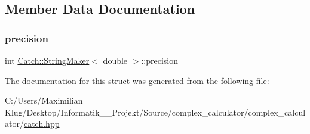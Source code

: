 \subsection{Member Data Documentation}
\mbox{\label{struct_catch_1_1_string_maker_3_01double_01_4_a15fa2b093c532ece7f1d0c713ebaee67}} 
\subsubsection{\texorpdfstring{precision}{precision}}
{\footnotesize\ttfamily int \mbox{\hyperlink{struct_catch_1_1_string_maker}{Catch\+::\+String\+Maker}}$<$ double $>$\+::precision\hspace{0.3cm}{\ttfamily [static]}}



The documentation for this struct was generated from the following file\+:\begin{DoxyCompactItemize}
\item 
C\+:/\+Users/\+Maximilian Klug/\+Desktop/\+Informatik\+\_\+\_\+\+Projekt/\+Source/complex\+\_\+calculator/complex\+\_\+calculator/\mbox{\hyperlink{catch_8hpp}{catch.\+hpp}}\end{DoxyCompactItemize}
